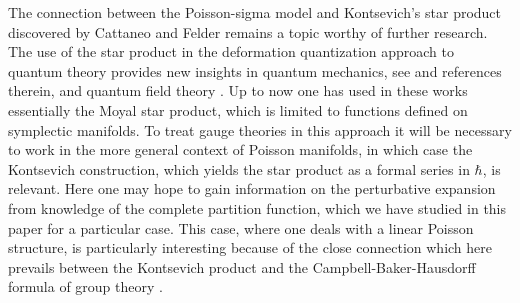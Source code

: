 \documentclass[a4paper,twoside,11pt]{article}
\numberwithin{equation}{section}
\begin{document}
The connection between the Poisson-sigma model and Kontsevich's star product discovered by Cattaneo and Felder \cite{CF1} remains a topic worthy of further research. The use of the star product in the deformation quantization approach to quantum theory provides new insights in quantum mechanics, see
\cite{HH} and references therein, and quantum field theory \cite{DF}. Up to now one has used in these works essentially the Moyal star product, which is limited to functions defined on symplectic manifolds. To treat gauge theories in this approach it will be necessary to work in the more general context of Poisson manifolds, in which case the Kontsevich construction, which yields the star product as a formal series in $\hbar$, is relevant. Here one may hope to gain information on the perturbative expansion from knowledge of the complete partition function, which we have studied in this paper for a particular case. This case, where one deals with a linear Poisson structure, is particularly interesting because of the close connection which here prevails between the Kontsevich product and the Campbell-Baker-Hausdorff formula of group theory \cite{KT}.  
\bigskip\\
%
\end{document}
